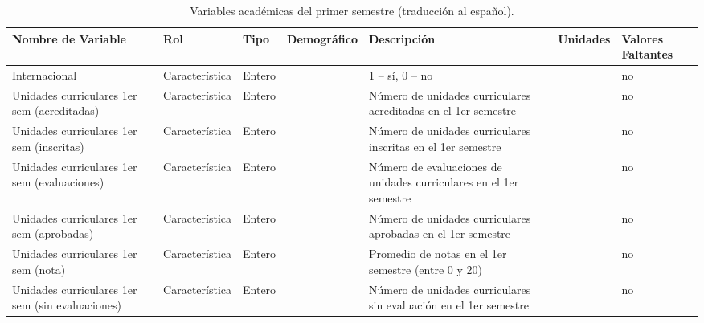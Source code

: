 
\begin{table}[H]
\centering
\begin{tabular}{|p{4cm}|p{3cm}|p{2cm}|p{2cm}|p{6cm}|p{2cm}|p{3cm}|}
\hline
\textbf{Nombre de Variable} & \textbf{Rol} & \textbf{Tipo} & \textbf{Demográfico} & \textbf{Descripción} & \textbf{Unidades} & \textbf{Valores Faltantes} \\ \hline
Internacional & Característica & Entero &  & 1 – sí, 0 – no &  & no \\ \hline
Unidades curriculares 1er sem (acreditadas) & Característica & Entero &  & Número de unidades curriculares acreditadas en el 1er semestre &  & no \\ \hline
Unidades curriculares 1er sem (inscritas) & Característica & Entero &  & Número de unidades curriculares inscritas en el 1er semestre &  & no \\ \hline
Unidades curriculares 1er sem (evaluaciones) & Característica & Entero &  & Número de evaluaciones de unidades curriculares en el 1er semestre &  & no \\ \hline
Unidades curriculares 1er sem (aprobadas) & Característica & Entero &  & Número de unidades curriculares aprobadas en el 1er semestre &  & no \\ \hline
Unidades curriculares 1er sem (nota) & Característica & Entero &  & Promedio de notas en el 1er semestre (entre 0 y 20) &  & no \\ \hline
Unidades curriculares 1er sem (sin evaluaciones) & Característica & Entero &  & Número de unidades curriculares sin evaluación en el 1er semestre &  & no \\ \hline
\end{tabular}
\caption{Variables académicas del primer semestre (traducción al español).}
\end{table}
